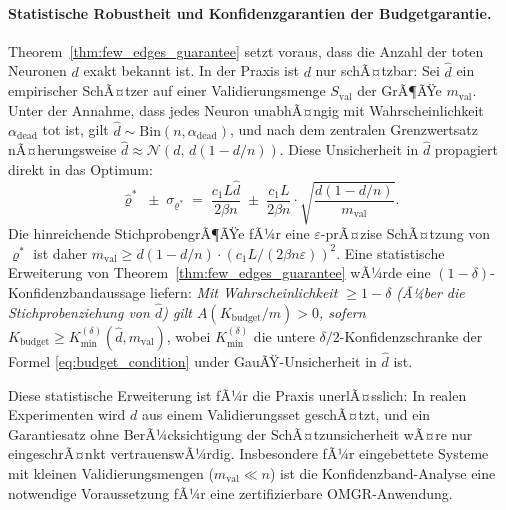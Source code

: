 ﻿\documentclass[12pt, a4paper, openany]{report}
\newcommand{\eps}{\varepsilon}
\begin{document}
\paragraph{Statistische Robustheit und Konfidenzgarantien der Budgetgarantie.}
Theorem~\ref{thm:few_edges_guarantee} setzt voraus, dass die Anzahl der
toten Neuronen $d$ exakt bekannt ist.  In der Praxis ist $d$ nur
schÃ¤tzbar: Sei $\hat{d}$ ein empirischer SchÃ¤tzer auf einer
Validierungsmenge $S_{\mathrm{val}}$ der GrÃ¶ÃŸe $m_{\mathrm{val}}$.  Unter
der Annahme, dass jedes Neuron unabhÃ¤ngig mit Wahrscheinlichkeit
$\alpha_{\mathrm{dead}}$ tot ist, gilt
$\hat{d} \sim \mathrm{Bin}(n, \alpha_{\mathrm{dead}})$, und nach dem
zentralen Grenzwertsatz nÃ¤herungsweise
$\hat{d} \approx \mathcal{N}(d,\,d(1 - d/n))$.  Diese Unsicherheit in
$\hat{d}$ propagiert direkt in das Optimum:
\[
  \hat\varrho^* \;\pm\; \sigma_{\varrho^*}
  \;=\; \frac{c_1 L \hat{d}}{2\beta n}
  \;\pm\; \frac{c_1 L}{2\beta n}
  \cdot\sqrt{\frac{d(1-d/n)}{m_{\mathrm{val}}}}.
\]
Die hinreichende StichprobengrÃ¶ÃŸe fÃ¼r eine $\eps$-prÃ¤zise SchÃ¤tzung von
$\varrho^*$ ist daher
$m_{\mathrm{val}} \geq d(1-d/n) \cdot (c_1 L / (2\beta n \eps))^2$.  Eine
statistische Erweiterung von Theorem~\ref{thm:few_edges_guarantee} wÃ¼rde
eine $(1-\delta)$-Konfidenzbandaussage liefern: \emph{Mit Wahrscheinlichkeit
$\geq 1-\delta$ (Ã¼ber die Stichprobenziehung von $\hat{d}$) gilt
$A(K_{\mathrm{budget}}/m) > 0$, sofern}
$K_{\mathrm{budget}} \geq K^{(\delta)}_{\mathrm{min}}(\hat{d}, m_{\mathrm{val}})$,
wobei $K^{(\delta)}_{\mathrm{min}}$ die untere $\delta/2$-Konfidenzschranke
der Formel \eqref{eq:budget_condition} under GauÃŸ-Unsicherheit in $\hat{d}$ ist.

Diese statistische Erweiterung ist fÃ¼r die Praxis unerlÃ¤sslich: In realen
Experimenten wird $d$ aus einem Validierungsset geschÃ¤tzt, und ein Garantie\-satz
ohne BerÃ¼cksichtigung der SchÃ¤tzunsicherheit wÃ¤re nur eingeschrÃ¤nkt
vertrauenswÃ¼rdig.  Insbesondere fÃ¼r eingebettete Systeme mit kleinen
Validierungsmengen ($m_{\mathrm{val}} \ll n$) ist die Konfidenz\-band-Analyse
eine notwendige Voraussetzung fÃ¼r eine zertifizierbare OMGR-Anwendung.
\end{document}
